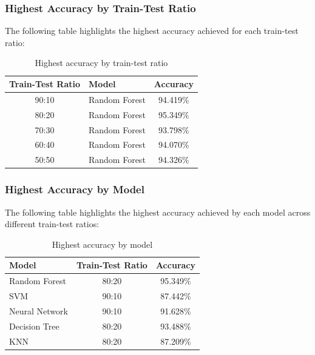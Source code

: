 \documentclass[a4paper,12pt]{report}
\begin{document}
\subsubsection{Highest Accuracy by Train-Test Ratio}

The following table highlights the highest accuracy achieved for each train-test ratio:

\begin{table}[h!]
\centering
\begin{tabular}{|c|l|c|}
\hline
\textbf{Train-Test Ratio} & \textbf{Model} & \textbf{Accuracy} \\
\hline
90:10 & Random Forest & 94.419\% \\
80:20 & Random Forest & 95.349\% \\
70:30 & Random Forest & 93.798\% \\
60:40 & Random Forest & 94.070\% \\
50:50 & Random Forest & 94.326\% \\
\hline
\end{tabular}
\caption{Highest accuracy by train-test ratio}
\end{table}

\subsubsection{Highest Accuracy by Model}

The following table highlights the highest accuracy achieved by each model across different train-test ratios:

\begin{table}[h!]
\centering
\begin{tabular}{|l|c|c|}
\hline
\textbf{Model} & \textbf{Train-Test Ratio} & \textbf{Accuracy} \\
\hline
Random Forest & 80:20 & 95.349\% \\
SVM & 90:10 & 87.442\% \\
Neural Network & 90:10 & 91.628\% \\
Decision Tree & 80:20 & 93.488\% \\
KNN & 80:20 & 87.209\% \\
\hline
\end{tabular}
\caption{Highest accuracy by model}
\end{table}
\end{document}
